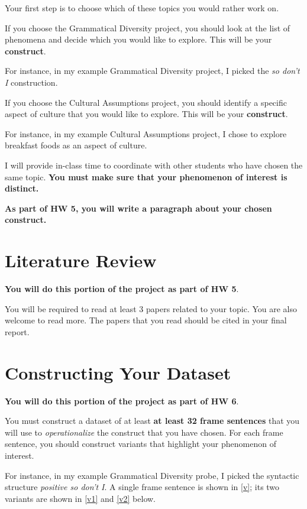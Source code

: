 \documentclass[12pt,table]{article}
\begin{document}
Your first step is to choose which of these topics you would rather work on. 

If you choose the Grammatical Diversity project, you should look at the list of phenomena and decide which you would like to explore. This will be your \textbf{construct}.

For instance, in my example Grammatical Diversity project, I picked the \textit{so don't I} construction. 

If you choose the Cultural Assumptions project, you should identify a specific aspect of culture that you would like to explore. This will be your \textbf{construct}.

For instance, in my example Cultural Assumptions project, I chose to explore breakfast foods as an aspect of culture.  

I will provide in-class time to coordinate with other students who have chosen the same topic. \textbf{You must make sure that your phenomenon of interest is distinct.} 

\textbf{As part of HW 5, you will write a paragraph about your chosen construct.}

\section{Literature Review}

\textbf{You will do this portion of the project as part of HW 5}.

You will be required to read at least 3 papers related to your topic. You are also welcome to read more. The papers that you read should be cited in your final report.

\section{Constructing Your Dataset}

\textbf{You will do this portion of the project as part of HW 6}.

You must construct a dataset of at least \textbf{at least 32 frame sentences} that you will use to \textit{operationalize} the construct that you have chosen. For each frame sentence, you should construct variants that highlight your phenomenon of interest. 

For instance, in my example Grammatical Diversity probe, I picked the syntactic structure \textit{positive so don't I}. A single frame sentence is shown in \ref{v}; its two variants are shown in \ref{v1} and \ref{v2} below.
\end{document}
